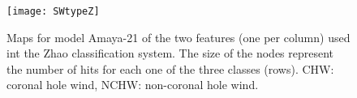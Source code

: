 \documentclass[utf8]{frontiersSCNS} %
\begin{document}
\begin{figure}[h!]\centering
	\texttt{[image: SWtypeZ]}
	\caption{Maps for model Amaya-21 of the two features (one per column) used int the Zhao classification system. The size of the nodes represent the number of hits for each one of the three classes (rows). CHW: coronal hole wind, NCHW: non-coronal hole wind.}\label{fig:SWtypeZ}
\end{figure}
\end{document}
